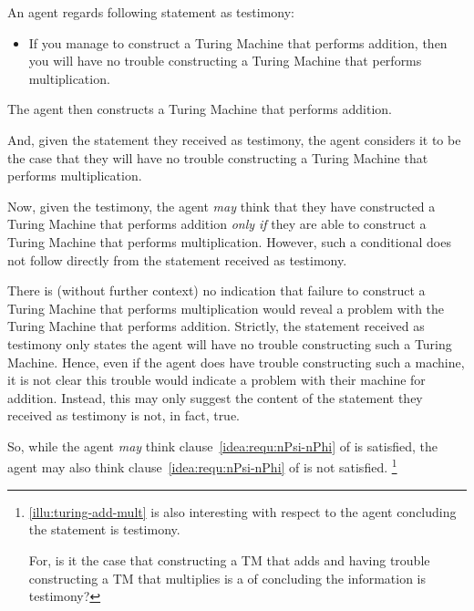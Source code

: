 \begin{note}[No entanglement]
  \begin{illustration}
    \label{illu:turing-add-mult}
    An agent regards following statement as testimony:

    \begin{itemize}
    \item
      If you manage to construct a Turing Machine that performs addition, then you will have no trouble constructing a Turing Machine that performs multiplication.
    \end{itemize}

    The agent then constructs a Turing Machine that performs addition.

    And, given the statement they received as testimony, the agent considers it to be the case that they will have no trouble constructing a Turing Machine that performs multiplication.
  \end{illustration}

  Now, given the testimony, the agent \emph{may} think that they have constructed a Turing Machine that performs addition \emph{only if} they are able to construct a Turing Machine that performs multiplication.
  However, such a conditional does not follow directly from the statement received as testimony.

  There is (without further context) no indication that failure to construct a Turing Machine that performs multiplication would reveal a problem with the Turing Machine that performs addition.
  Strictly, the statement received as testimony only states the agent will have no trouble constructing such a Turing Machine.
  Hence, even if the agent does have trouble constructing such a machine, it is not clear this trouble would indicate a problem with their machine for addition.
  Instead, this may only suggest the content of the statement they received as testimony is not, in fact, true.

  So, while the agent \emph{may} think clause~\ref{idea:requ:nPsi-nPhi} of \iRequ{} is satisfied, the agent may also think clause~\ref{idea:requ:nPsi-nPhi} of \iRequ{} is not satisfied.%
  \footnote{
    \autoref{illu:turing-add-mult} is also interesting with respect to the agent concluding the statement is testimony.

    For, is it the case that constructing a TM that adds and having trouble constructing a TM that multiplies is a \requ{} of concluding the information is testimony?

}
\end{note}

